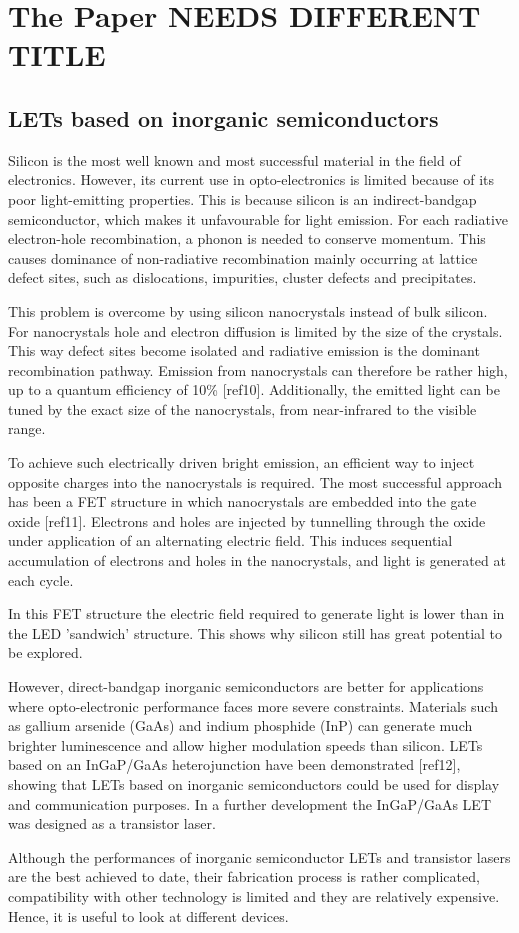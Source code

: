 \section{The Paper NEEDS DIFFERENT TITLE}

\subsection{LETs based on inorganic semiconductors} %


\citep{Muccini}

Silicon is the most well known and most successful material in the field of electronics. However, its current use in opto-electronics is limited because of its poor light-emitting properties. This is because silicon is an indirect-bandgap semiconductor, which makes it unfavourable for light emission. For each radiative electron-hole recombination, a phonon is needed to conserve momentum. This causes dominance of non-radiative recombination mainly occurring at lattice defect sites, such as dislocations, impurities, cluster defects and precipitates.

This problem is overcome by using silicon nanocrystals instead of bulk silicon. For nanocrystals hole and electron diffusion is limited by the size of the crystals. This way defect sites become isolated and radiative emission is the dominant recombination pathway. Emission from nanocrystals can therefore be rather high, up to a quantum efficiency of  10\% [ref10]. Additionally, the emitted light can be tuned by the exact size of the nanocrystals, from near-infrared to the visible range. 

To achieve such electrically driven bright emission, an efficient way to inject opposite charges into the nanocrystals is required. The most successful approach has been a FET structure in which nanocrystals are embedded into the gate oxide [ref11]. Electrons and holes are injected by tunnelling through the oxide under application of an alternating electric field. This induces sequential accumulation of electrons and holes in the nanocrystals, and light is generated at each cycle.

In this FET structure the electric field required to generate light is lower than in the LED 'sandwich' structure. This shows why silicon still has great potential to be explored.

However, direct-bandgap inorganic semiconductors are better for applications where opto-electronic performance faces more severe constraints. Materials such as gallium arsenide (GaAs) and indium phosphide (InP) can generate much brighter luminescence and allow higher modulation speeds than silicon. LETs based on an InGaP/GaAs heterojunction have been demonstrated [ref12], showing that LETs based on inorganic semiconductors could be used for display and communication purposes. In a further development the InGaP/GaAs LET was designed as a transistor laser.

Although the performances of inorganic semiconductor LETs and transistor lasers are the best achieved to date, their fabrication process is rather complicated, compatibility with other technology is limited and they are relatively expensive. Hence, it is useful to look at different devices.
